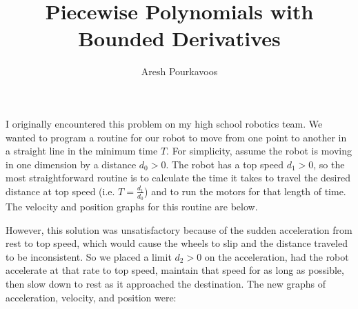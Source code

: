 \documentclass{article}
\begin{document}
\title{Piecewise Polynomials with Bounded Derivatives}
\author{Aresh Pourkavoos}
\maketitle

I originally encountered this problem on my high school robotics team.
We wanted to program a routine for our robot
to move from one point to another in a straight line in the minimum time $T$.
For simplicity, assume the robot
is moving in one dimension by a distance $d_0 > 0$.
The robot has a top speed $d_1 > 0$,
so the most straightforward routine is
to calculate the time it takes to travel the desired distance at top speed
(i.e. $T=\frac{d_1}{d_0}$)
and to run the motors for that length of time.
The velocity and position graphs for this routine are below.
\begin{center}
\end{center}
However, this solution was unsatisfactory
because of the sudden acceleration from rest to top speed,
which would cause the wheels to slip
and the distance traveled to be inconsistent.
So we placed a limit $d_2 > 0$ on the acceleration,
had the robot accelerate at that rate to top speed,
maintain that speed for as long as possible,
then slow down to rest as it approached the destination.
The new graphs of acceleration, velocity, and position were:
\end{document}
